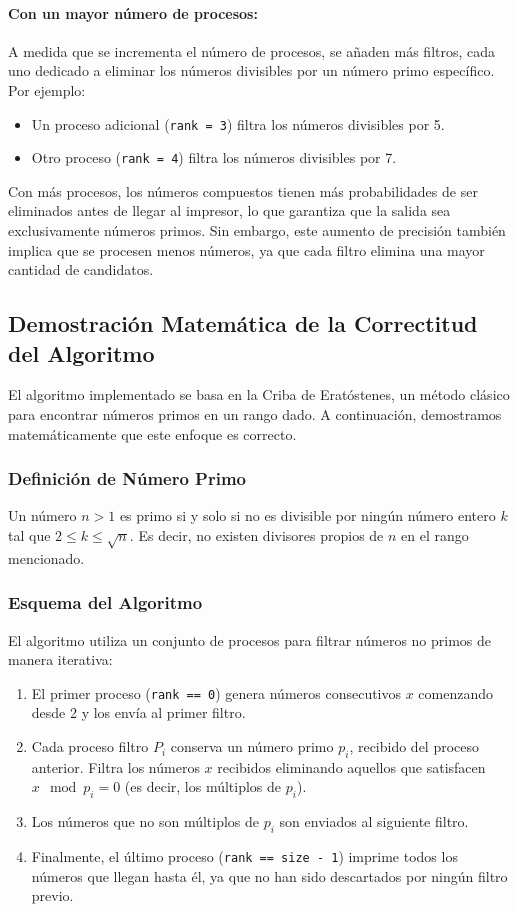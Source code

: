 \documentclass[a4paper,12pt]{article}
\begin{document}
\paragraph{Con un mayor número de procesos:}
A medida que se incrementa el número de procesos, se añaden más filtros, cada uno dedicado a eliminar los números divisibles por un número primo específico. Por ejemplo:
\begin{itemize}
    \item Un proceso adicional (\texttt{rank = 3}) filtra los números divisibles por 5.
    \item Otro proceso (\texttt{rank = 4}) filtra los números divisibles por 7.
\end{itemize}
Con más procesos, los números compuestos tienen más probabilidades de ser eliminados antes de llegar al impresor, lo que garantiza que la salida sea exclusivamente números primos. Sin embargo, este aumento de precisión también implica que se procesen menos números, ya que cada filtro elimina una mayor cantidad de candidatos.


\subsection{Demostración Matemática de la Correctitud del Algoritmo}

El algoritmo implementado se basa en la Criba de Eratóstenes, un método clásico para encontrar números primos en un rango dado. A continuación, demostramos matemáticamente que este enfoque es correcto.

\subsubsection{Definición de Número Primo}

Un número \( n > 1 \) es primo si y solo si no es divisible por ningún número entero \( k \) tal que \( 2 \leq k \leq \sqrt{n} \). Es decir, no existen divisores propios de \( n \) en el rango mencionado.

\subsubsection{Esquema del Algoritmo}

El algoritmo utiliza un conjunto de procesos para filtrar números no primos de manera iterativa:
\begin{enumerate}
    \item El primer proceso (\texttt{rank == 0}) genera números consecutivos \( x \) comenzando desde 2 y los envía al primer filtro.
    \item Cada proceso filtro \( P_i \) conserva un número primo \( p_i \), recibido del proceso anterior. Filtra los números \( x \) recibidos eliminando aquellos que satisfacen \( x \mod p_i = 0 \) (es decir, los múltiplos de \( p_i \)).
    \item Los números que no son múltiplos de \( p_i \) son enviados al siguiente filtro.
    \item Finalmente, el último proceso (\texttt{rank == size - 1}) imprime todos los números que llegan hasta él, ya que no han sido descartados por ningún filtro previo.
\end{enumerate}
\end{document}
